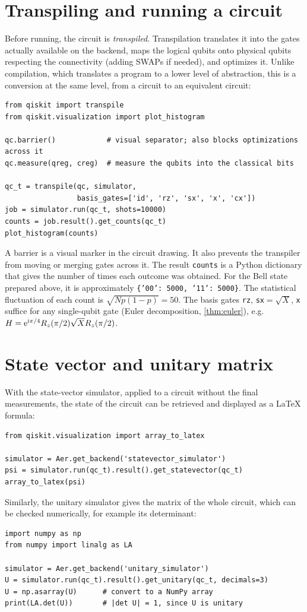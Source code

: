 \section{Transpiling and running a circuit}
Before running, the circuit is \emph{transpiled}. Transpilation translates it into the gates actually available on the backend, maps the logical qubits onto physical qubits respecting the
connectivity (adding SWAPs if needed), and optimizes it. Unlike compilation, which translates a program to a lower level of abstraction, this is a conversion at the same level, from a circuit
to an equivalent circuit:
\begin{lstlisting}
from qiskit import transpile
from qiskit.visualization import plot_histogram

qc.barrier()            # visual separator; also blocks optimizations across it
qc.measure(qreg, creg)  # measure the qubits into the classical bits

qc_t = transpile(qc, simulator,
                 basis_gates=['id', 'rz', 'sx', 'x', 'cx'])
job = simulator.run(qc_t, shots=10000)
counts = job.result().get_counts(qc_t)
plot_histogram(counts)
\end{lstlisting}
A barrier is a visual marker in the circuit drawing. It also prevents the transpiler from moving or merging gates across it. The result \texttt{counts} is a Python dictionary that gives the number
of times each outcome was obtained. For the Bell state prepared above, it is approximately \texttt{\{'00': 5000, '11': 5000\}}. The statistical fluctuation of each count is $\sqrt{Np(1-p)}=50$.
The basis gates \texttt{rz}, \texttt{sx}$=\sqrt X$, \texttt{x} suffice for any single-qubit gate (Euler decomposition, \cref{thm:euler}), e.g.\ $H=\mathrm e^{\mathrm i\pi/4}R_z(\pi/2)\sqrt XR_z(\pi/2)$.

\section{State vector and unitary matrix}
With the state-vector simulator, applied to a circuit without the final measurements, the state of the circuit can be retrieved and displayed as a \LaTeX{} formula:
\begin{lstlisting}
from qiskit.visualization import array_to_latex

simulator = Aer.get_backend('statevector_simulator')
psi = simulator.run(qc_t).result().get_statevector(qc_t)
array_to_latex(psi)
\end{lstlisting}
Similarly, the unitary simulator gives the matrix of the whole circuit, which can be checked numerically, for example its determinant:
\begin{lstlisting}
import numpy as np
from numpy import linalg as LA

simulator = Aer.get_backend('unitary_simulator')
U = simulator.run(qc_t).result().get_unitary(qc_t, decimals=3)
U = np.asarray(U)      # convert to a NumPy array
print(LA.det(U))       # |det U| = 1, since U is unitary
\end{lstlisting}

